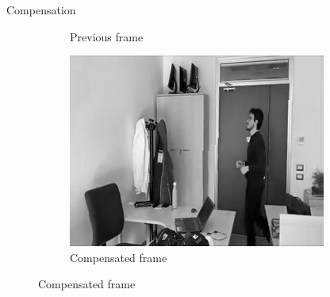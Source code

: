 \documentclass[aspectratio=1610,xcolor=dvipsnames]{beamer}
\begin{document}
\begin{frame}{Compensation}
\begin{figure}[htbp]
\begin{subfigure}[b]{0.3\textwidth}
            \caption{Previous frame}
            \label{fig:curr-frame}
        \end{subfigure}
        \hfill
        \begin{subfigure}[b]{0.3\textwidth}
            \includegraphics[width=.9\textwidth]{../assets/images/04-compensated.png}
            \caption{Compensated frame}
            \label{fig:compensated}
        \end{subfigure}
        

\end{figure}
\end{frame}
\end{document}
